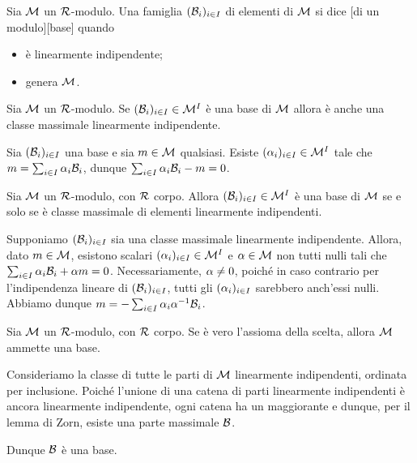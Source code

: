 \begin{Definition}
	Sia $\mathcal{M}$ un $\mathcal{R}$-modulo. Una famiglia
	$(\mathcal{B}_i)_{i \in I}$ di elementi di $\mathcal{M}$ si dice
	[di un modulo][base] quando
	\begin{itemize}
		\item \`e linearmente indipendente;
		\item genera $\mathcal{M}$.
	\end{itemize}
\end{Definition}
\begin{Theorem}
	Sia $\mathcal{M}$ un $\mathcal{R}$-modulo. Se 
	$(\mathcal{B}_i)_{i \in I} \in \mathcal{M}^I$ \`e una base di
	$\mathcal{M}$ allora \`e anche una classe massimale linearmente
	indipendente.
\end{Theorem}
\Proof Sia $(\mathcal{B}_i)_{i \in I}$ una base e sia $m \in
\mathcal{M}$ qualsiasi. Esiste $(\alpha_i)_{i \in I} \in \mathcal{M}^I$ tale che
$m = \sum_{i \in I} \alpha_i \mathcal{B}_i$, dunque
$\sum_{i \in I} \alpha_i \mathcal{B}_i - m = 0$. \EndProof
\begin{Corollary}
	Sia $\mathcal{M}$ un $\mathcal{R}$-modulo, con $\mathcal{R}$ corpo. Allora
	$(\mathcal{B}_i)_{i \in I} \in \mathcal{M}^I$ \`e una base di
	$\mathcal{M}$ se e solo se \`e classe massimale di elementi
	linearmente indipendenti.
\end{Corollary}
\Proof Supponiamo $(\mathcal{B}_i)_{i \in I}$ sia una classe massimale
linearmente indipendente. Allora, dato $m \in \mathcal{M}$,
esistono scalari $(\alpha_i)_{i \in I} \in \mathcal{M}^I$ e $\alpha \in
\mathcal{M}$ non tutti nulli tali che $\sum_{i \in I} \alpha_i \mathcal{B}_i
+ \alpha m = 0$. Necessariamente, $\alpha \neq 0$, poich\'e
in caso contrario per l'indipendenza lineare di
$(\mathcal{B}_i)_{i \in I}$, tutti gli $(\alpha_i)_{i \in I}$ sarebbero
anch'essi nulli. Abbiamo dunque
$m = - \sum_{i \in I} \alpha_i\alpha^{-1} \mathcal{B}_i$.
\EndProof
\begin{Theorem}
	Sia $\mathcal{M}$ un $\mathcal{R}$-modulo, con $\mathcal{R}$ corpo. Se \`e vero
	l'assioma della scelta, allora $\mathcal{M}$ ammette una base.
\end{Theorem}
\Proof Consideriamo la classe di tutte le parti di $\mathcal{M}$ linearmente
indipendenti, ordinata per inclusione. Poich\'e l'unione di una catena di
parti linearmente indipendenti \`e ancora linearmente indipendente, ogni
catena ha un maggiorante e dunque, per il lemma di Zorn, esiste una parte
massimale $\mathcal{B}$.
\par Dunque $\mathcal{B}$ \`e una base. \EndProof
